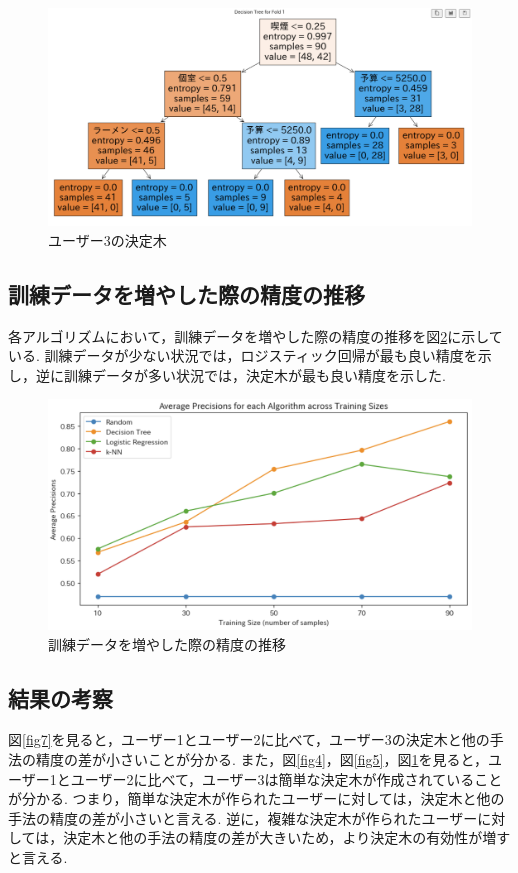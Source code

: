 \documentclass[12pt,a4j]{jreport}
\begin{document}
\begin{figure}[htbp]
  \begin{center}
    \includegraphics[width=12cm]{image/fig6.png}
    \caption{ユーザー3の決定木}
    \label{fig6}
  \end{center}
\end{figure}

\subsection{訓練データを増やした際の精度の推移}
各アルゴリズムにおいて，訓練データを増やした際の精度の推移を図\ref{fig9}に示している.
訓練データが少ない状況では，ロジスティック回帰が最も良い精度を示し，逆に訓練データが多い状況では，決定木が最も良い精度を示した.\\

\begin{figure}[htbp]
  \begin{center}
    \includegraphics[width=14cm]{image/fig9.png}
    \caption{訓練データを増やした際の精度の推移}
    \label{fig9}
  \end{center}
\end{figure}

\subsection{結果の考察}
図\ref{fig7}を見ると，ユーザー1とユーザー2に比べて，ユーザー3の決定木と他の手法の精度の差が小さいことが分かる.
また，図\ref{fig4}，図\ref{fig5}，図\ref{fig6}を見ると，ユーザー1とユーザー2に比べて，ユーザー3は簡単な決定木が作成されていることが分かる.
つまり，簡単な決定木が作られたユーザーに対しては，決定木と他の手法の精度の差が小さいと言える.
逆に，複雑な決定木が作られたユーザーに対しては，決定木と他の手法の精度の差が大きいため，より決定木の有効性が増すと言える.
\end{document}
